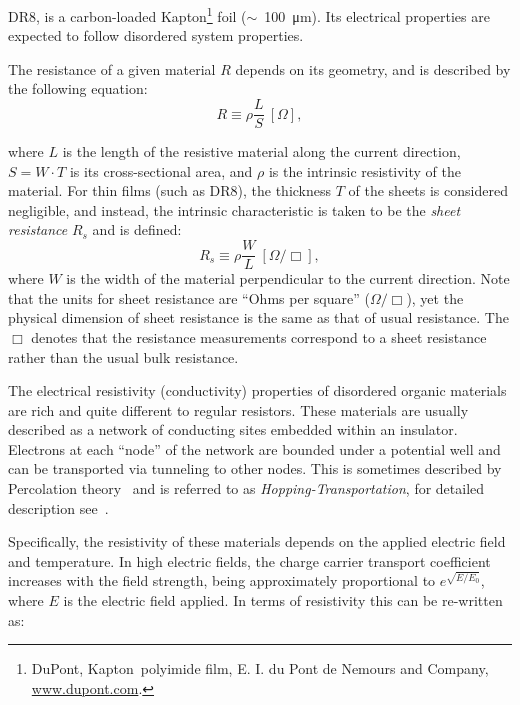 \documentclass[a4paper,12pt]{article}
\newcommand{\DR}{DR8}
\begin{document}
{\DR}, is a carbon-loaded Kapton\footnote{DuPont\texttrademark, Kapton\textregistered \, polyimide film, E. I. du Pont de Nemours and Company, \url{www.dupont.com}.} foil ($\sim$~\SI{100}{\micro\metre}). 
Its electrical properties are expected to follow disordered system properties. 

The resistance of a given material $R$ depends on its geometry, and is described by the following equation:
\begin{equation}
\label{eq:Res_3D}
R \equiv \rho \frac{L}{S} \ [\Omega],
\end{equation}

where $L$ is the length of the resistive material along the current direction, $S = W \cdot T$ is its cross-sectional area, and $\rho$ is the intrinsic resistivity of the material. 
For thin films (such as {\DR}), the thickness $T$ of the sheets is considered negligible, and instead, the intrinsic characteristic is taken to be the \emph{sheet resistance} $R_s$ and is defined:
\begin{equation}
\label{eq:res_2D}
R_s \equiv \rho \frac{W}{L} \ [\Omega / \Box],
\end{equation}
where $W$ is the width of the material perpendicular to the current direction. 
Note that the units for sheet resistance are ``Ohms per square'' ($\Omega / \Box$), yet the physical dimension of sheet resistance is the same as that of usual resistance. 
The $\Box$ denotes that the resistance measurements correspond to a sheet resistance rather than the usual bulk resistance.

The electrical resistivity (conductivity) properties of disordered organic materials are rich and quite different to regular resistors. 
These materials are usually described as a network of conducting sites embedded within an insulator. 
Electrons at each ``node'' of the network are bounded under a potential well and can be transported via tunneling to other nodes. 
This is sometimes described by Percolation theory~\cite{Havlin1996} and is referred to as \emph{Hopping-Transportation}, for detailed description see~\cite{organicDisorderMaterial,electronicPhotonicMaterials}.

Specifically, the resistivity of these materials depends on the applied electric field and temperature.  
In high electric fields, the charge carrier transport coefficient increases with the field strength, being approximately proportional to $e^{\sqrt{E/E_0}}$, where $E$ is the electric field applied. 
In terms of resistivity this can be re-written as:
\end{document}
